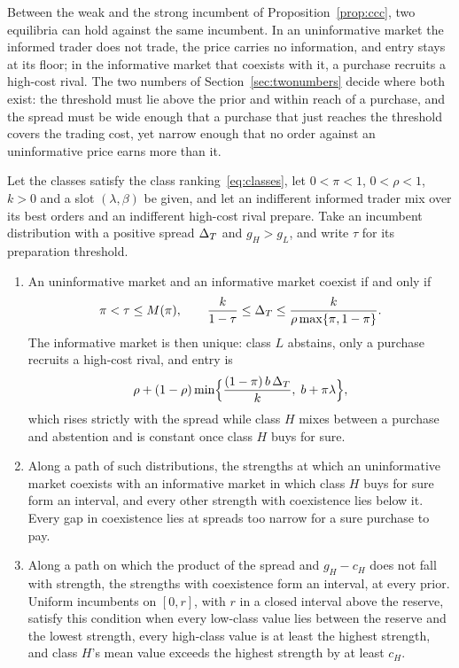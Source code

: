 Between the weak and the strong incumbent of Proposition~\ref{prop:ccc}, two equilibria can hold against the same
incumbent. In an uninformative market the informed trader does not trade, the price carries no information, and entry stays at its
floor; in the informative market that coexists with it, a purchase recruits a high-cost rival. The two numbers
of Section~\ref{sec:twonumbers} decide where both exist: the threshold must lie above the prior and within reach of
a purchase, and the spread must be wide enough that a purchase that just reaches the threshold covers the trading
cost, yet narrow enough that no order against an uninformative price earns more than it.

\begin{proposition}\label{prop:coexistence}
Let the classes satisfy the class ranking~\eqref{eq:classes}, let \(0<\pi<1\), \(0<\rho<1\), \(k>0\) and a slot
\((\lambda,\beta)\) be given, and let an indifferent informed trader mix over its best orders and an indifferent high-cost
rival prepare. Take an incumbent distribution with a positive spread \(\Delta_T\) and \(g_H>g_L\), and write \(\tau\)
for its preparation threshold.
\begin{enumerate}[label=(\alph*),leftmargin=2em]
\item An uninformative market and an informative market coexist if and only if
\[
\pi<\tau\le M(\pi),\qquad \frac{k}{1-\tau}\le\Delta_T\le\frac{k}{\rho\max\{\pi,1-\pi\}}.
\]
The informative market is then unique: class \(L\) abstains, only a purchase recruits a high-cost rival, and
entry is
\[
\rho+(1-\rho)\min\Bigl\{\frac{(1-\pi)\,b\,\Delta_T}{k},\;b+\pi\lambda\Bigr\},
\]
which rises strictly with the spread while class \(H\) mixes between a purchase and abstention and is constant once
class \(H\) buys for sure.
\item Along a path of such distributions, the strengths at which an uninformative market coexists with an informative market
in which class \(H\) buys for sure form an interval, and every other strength with coexistence lies below it. Every
gap in coexistence lies at spreads too narrow for a sure purchase to pay.
\item Along a path on which the product of the spread and \(g_H-c_H\) does not fall with strength, the strengths
with coexistence form an interval, at every prior. Uniform incumbents on \([0,r]\), with \(r\) in a closed interval
above the reserve, satisfy this condition when every low-class value lies between the reserve and the lowest
strength, every high-class value is at least the highest strength, and class \(H\)'s mean value exceeds the highest
strength by at least \(c_H\).
\end{enumerate}
\end{proposition}

